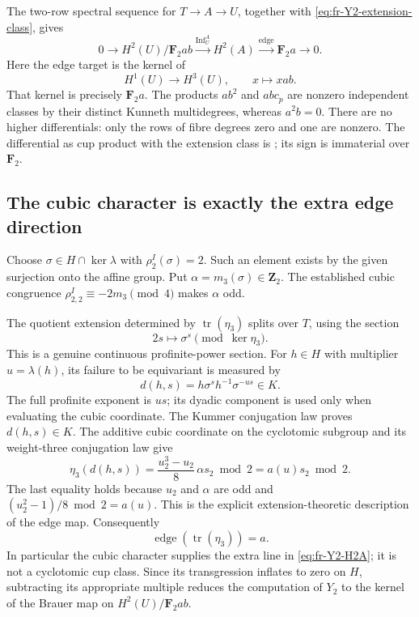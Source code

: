 The two-row spectral sequence for \(T\to A\to U\), together
with \eqref{eq:fr-Y2-extension-class}, gives
\begin{equation}\label{eq:fr-Y2-H2A}
 0\longrightarrow H^2(U)/\mathbf F_2ab
 \xrightarrow{\operatorname{Inf}_U^A}H^2(A)
 \xrightarrow{\operatorname{edge}}\mathbf F_2a
 \longrightarrow0.
\end{equation}
Here the edge target is the kernel of
\[
 H^1(U)\longrightarrow H^3(U),\qquad x\longmapsto xab.
\]
That kernel is precisely \(\mathbf F_2a\).
The products \(ab^2\) and \(abc_p\) are nonzero independent
classes by their distinct Kunneth multidegrees, whereas
\(a^2b=0\). There are no higher differentials: only the rows
of fibre degrees zero and one are nonzero.
The differential as cup product with the extension class
is \cite[Chapter~III, \S6, Theorems~3--4,
pp.~132--133]{HochschildSerre1953}; its sign is immaterial over
\(\mathbf F_2\).

\subsection{The cubic character is exactly the extra edge direction}

Choose \(\sigma\in H\cap\ker\lambda\) with
\(\rho_2^I(\sigma)=2\). Such an element exists by the
given surjection onto the affine group. Put
\(\alpha=m_3(\sigma)\in\mathbf Z_2\).
The established cubic congruence
\(\rho_{2,2}^I\equiv-2m_3\pmod4\) makes \(\alpha\) odd.

The quotient extension determined by \(\operatorname{tr}(\eta_3)\)
splits over \(T\), using the section
\[
             2s\longmapsto \sigma^s\pmod{\ker\eta_3}.
\]
This is a genuine continuous profinite-power section.
For \(h\in H\) with multiplier \(u=\lambda(h)\), its failure
to be equivariant is measured by
\[
 d(h,s)=h\sigma^s h^{-1}\sigma^{-us}\in K.
\]
The full profinite exponent is \(us\); its dyadic component
is used only when evaluating the cubic coordinate.
The Kummer conjugation law proves \(d(h,s)\in K\).
The additive cubic coordinate on the cyclotomic subgroup
and its weight-three conjugation law give
\[
 \eta_3(d(h,s))
 =\frac{u_2^3-u_2}{8}\,\alpha s_2\bmod2
 =a(u)s_2\bmod2.
\]
The last equality holds because \(u_2\) and \(\alpha\) are odd
and \((u_2^2-1)/8\bmod2=a(u)\).
This is the explicit extension-theoretic description of the edge map.
Consequently
\begin{equation}\label{eq:fr-Y2-eta-edge}
       \operatorname{edge}(\operatorname{tr}(\eta_3))=a.
\end{equation}
In particular the cubic character supplies the extra line in
\eqref{eq:fr-Y2-H2A}; it is not a cyclotomic cup class.
Since its transgression inflates to zero on \(H\), subtracting
its appropriate multiple reduces the computation of \(Y_2\)
to the kernel of the Brauer map on \(H^2(U)/\mathbf F_2ab\).

